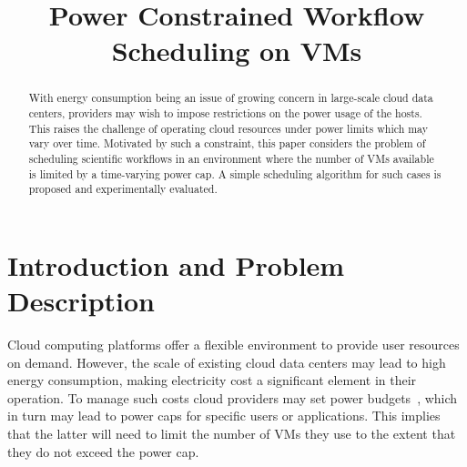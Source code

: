\documentclass[10pt, conference, compsocconf]{IEEEtran} %
\begin{document}
\title{Power Constrained Workflow Scheduling on VMs}
\author{
}

\maketitle

\begin{abstract}
With energy consumption being an issue of growing concern in large-scale cloud data centers, providers may wish to impose restrictions on the power usage of the hosts.
This raises the challenge of operating cloud resources under power limits which may vary over time.
Motivated by such a constraint, this paper considers the problem of scheduling scientific workflows in an environment where the number of VMs available is limited by a time-varying power cap.
A simple scheduling algorithm for such cases is proposed and experimentally evaluated.
\end{abstract}

\section{Introduction and Problem Description} %
\label{sec:intr-probl-descr}

Cloud computing platforms offer a flexible environment to provide user resources on demand.
However, the scale of existing cloud data centers may lead to high energy consumption, making electricity cost a significant element in their operation.
To manage such costs cloud providers may set power budgets~\cite{zhang2011capping}, which in turn may lead to power caps for specific users or applications.
This implies that the latter will need to limit the number of VMs they use to the extent that they do not exceed the power cap.
\end{document}
